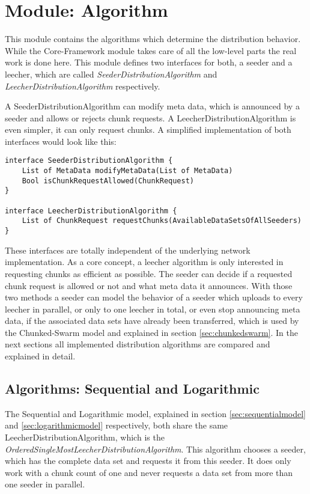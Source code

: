 \cleardoublepage
\chapter{Module: Algorithm}
\label{ch:algorithm}
This module contains the algorithms which determine the distribution behavior. While the Core-Framework module takes care of all the low-level parts the real work is done here. This module defines two interfaces for both, a seeder and a leecher, which are called \emph{SeederDistributionAlgorithm} and \emph{LeecherDistributionAlgorithm} respectively. 

A SeederDistributionAlgorithm can modify meta data, which is announced by a seeder and allows or rejects chunk requests. A LeecherDistributionAlgorithm is even simpler, it can only request chunks. A simplified implementation of both interfaces would look like this:

\begin{verbatim}
interface SeederDistributionAlgorithm {
    List of MetaData modifyMetaData(List of MetaData)
    Bool isChunkRequestAllowed(ChunkRequest)
}

interface LeecherDistributionAlgorithm {
    List of ChunkRequest requestChunks(AvailableDataSetsOfAllSeeders)
}
\end{verbatim}

These interfaces are totally independent of the underlying network implementation. As a core concept, a leecher algorithm is only interested in requesting chunks as efficient as possible. The seeder can decide if a requested chunk request is allowed or not and what meta data it announces. With those two methods a seeder can model the behavior of a seeder which uploads to every leecher in parallel, or only to one leecher in total, or even stop announcing meta data, if the associated data sets have already been transferred, which is used by the Chunked-Swarm model and explained in section \ref{sec:chunkedswarm}. In the next sections all implemented distribution algorithms are compared and explained in detail.

\section{Algorithms: Sequential and Logarithmic}
\label{sec:seqlog}
The Sequential and Logarithmic model, explained in section \ref{sec:sequentialmodel} and \ref{sec:logarithmicmodel} respectively, both share the same LeecherDistributionAlgorithm, which is the \emph{OrderedSingleMostLeecherDistributionAlgorithm}. This algorithm chooses a seeder, which has the complete data set and requests it from this seeder. It does only work with a chunk count of one and never requests a data set from more than one seeder in parallel.

